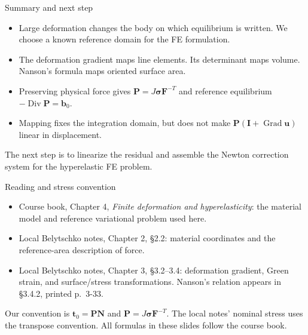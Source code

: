 \documentclass[11pt,aspectratio=169]{beamer}
\newcommand{\bu}{\bm u}
\newcommand{\bN}{\bm N}
\newcommand{\bb}{\bm b}
\newcommand{\bt}{\bm t}
\newcommand{\bI}{\bm I}
\newcommand{\bF}{\bm F}
\newcommand{\bP}{\bm P}
\newcommand{\bsig}{\bm\sigma}
\newcommand{\Grad}{\operatorname{Grad}}
\newcommand{\Div}{\operatorname{Div}}
\begin{document}
\begin{frame}{Summary and next step}
\begin{itemize}
\item Large deformation changes the body on which equilibrium is written.
We choose a known reference domain for the FE formulation.
\item The deformation gradient maps line elements.
Its determinant maps volume. Nanson's formula maps oriented surface area.
\item Preserving physical force gives $\bP=J\bsig\bF^{-T}$ and
reference equilibrium $-\Div\bP=\bb_0$.
\item Mapping fixes the integration domain, but does not make
$\bP(\bI+\Grad\bu)$ linear in displacement.
\end{itemize}
The next step is to linearize the residual and assemble the Newton correction
system for the hyperelastic FE problem.
\end{frame}

\begin{frame}{Reading and stress convention}
\begin{itemize}
\item Course book, Chapter 4, \emph{Finite deformation and hyperelasticity}:
the material model and reference variational problem used here.
\item Local Belytschko notes, Chapter 2, \S2.2:
material coordinates and the reference-area description of force.
\item Local Belytschko notes, Chapter 3, \S3.2--3.4:
deformation gradient, Green strain, and surface/stress transformations.
Nanson's relation appears in \S3.4.2, printed p.\ 3-33.
\end{itemize}
Our convention is $\bt_0=\bP\bN$ and $\bP=J\bsig\bF^{-T}$.
The local notes' nominal stress uses the transpose convention.
All formulas in these slides follow the course book.
\end{frame}
\end{document}
